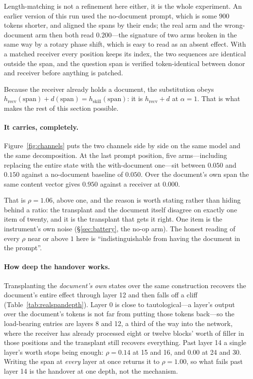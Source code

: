\documentclass{article}
\newcommand{\dvec}{\ensuremath{d}}
\begin{document}
Length-matching is not a refinement here either, it is the whole experiment. An
earlier version of this run used the no-document
prompt, which is some $900$ tokens shorter, and aligned the spans by their ends;
the real arm and the wrong-document arm then both read $0.200$---the signature
of two arms broken in the same way by a rotary phase shift, which is easy to
read as an absent effect. With a matched receiver every position keeps its
index, the two sequences are identical outside the span, and the question span
is verified token-identical between donor and receiver before anything is
patched.

Because the receiver already holds a document, the substitution obeys
$h_{\text{recv}}(\text{span}) + \dvec(\text{span}) = h_{\text{skill}}(\text{span})$: it is $h_{\text{recv}} + \dvec$ at $\alpha=1$. That is
what makes the rest of this section possible.

\paragraph{It carries, completely.} Figure~\ref{fig:channels} puts the two
channels side by side on the same model and the same decomposition. At the last
prompt position, five arms---including replacing the entire state with the
with-document one---sit between $0.050$ and $0.150$ against a no-document
baseline of $0.050$. Over the document's own span the same content vector gives
$0.950$ against a receiver at $0.000$.

That is $\rho = 1.06$, above one, and the reason is worth stating rather than
hiding behind a ratio: the transplant and the document itself disagree on
exactly one item of twenty, and it is the transplant that gets it right. One
item is the instrument's own noise (\S\ref{sec:battery}, the no-op arm). The
honest reading of every $\rho$ near or above $1$ here is ``indistinguishable
from having the document in the prompt''.



\paragraph{How deep the handover works.} Transplanting the \emph{document's own}
states over the same construction recovers the document's entire effect through
layer 12 and then falls off a cliff (Table~\ref{tab:realspandepth}). Layer 0 is
close to tautological---a layer's output over the document's tokens is not far
from putting those tokens back---so the load-bearing entries are layers 8 and
12, a third of the way into
the network, where the receiver has already processed eight or twelve blocks'
worth of filler in those positions and the transplant still recovers
everything. Past layer 14 a single layer's worth stops being enough: $\rho =
0.14$ at 15 and 16, and $0.00$ at 24 and 30. Writing
the span at \emph{every} layer at once returns it to $\rho = 1.00$, so what
fails past layer 14 is the handover at one depth, not the mechanism.
\end{document}
